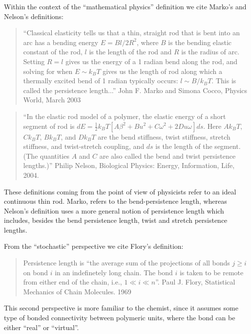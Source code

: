 Within the context of  the ``mathematical physics'' definition we cite
Marko's and Nelson's definitions:

\begin{quotation}
``Classical elasticity tells us that a thin, straight rod that is bent
into an arc has a bending energy $E=Bl/2R^2$, where $B$ is the bending
elastic constant of the  rod, $l$ is the length of the  rod and $R$ is
the radius  of arc. Setting  $R=l$ gives us  the energy of a  1 radian
bend along the rod, and solving  for when $E \sim k_{B}T$ gives us the
length  of  rod along  which  a thermally  excited  bend  of 1  radian
typically occurs:  $l \sim B/k_{B}T$.  This is  called the persistence
length...'' John F. Marko and Simona Cocco, Physics World, March 2003
\end{quotation}

\begin{quotation}
``In the elastic rod model of a polymer, the elastic energy of a short
  segment       of      rod       is       $dE=\frac{1}{2}      k_{B}T
  [A\beta^2+Bu^2+C\omega^2+2Du\omega] ds$.  Here $Ak_{B}T$, $Ck_{B}T$,
  $Bk_{B}T$, and  $Dk_{B}T$ are  the bend stiffness,  twist stiffness,
  stretch  stiffness,  and twist-stretch  coupling,  and  $ds$ is  the
  length of the segment.  (The  quantities $A$ and $C$ are also called
  the   bend  and  twist   persistence  lengths.)''    Philip  Nelson,
  Biological Physics: Energy, Information, Life, 2004.
\end{quotation}

These definitions coming from the point of view of physicists refer to
an ideal  continuous thin rod.  Marko, refers  to the bend-persistence
length,  whereas Nelson's  definition uses  a more  general  notion of
persistence  length  which  includes,  besides  the  bend  persistence
length, twist and stretch persistence lengths.

From the ``stochastic'' perspective we cite Flory's definition:

\begin{quotation}
Persistence  length is  ``the average  sum of  the projections  of all
bonds $ j \geq i$ on bond $i$ in an indefinetely long chain.  The bond
$i$ is taken to be remote from either end of the chain, i.e., $1 \ll i
\ll   n$''.   Paul   J.   Flory,  Statistical   Mechanics   of   Chain
Molecules. 1969
\end{quotation}


This  second perspective  is more  familiar to  the chemist,  since it
assumes  some type  of  bonded connectivity  between polymeric  units,
where the bond can be either ``real'' or ``virtual''.

